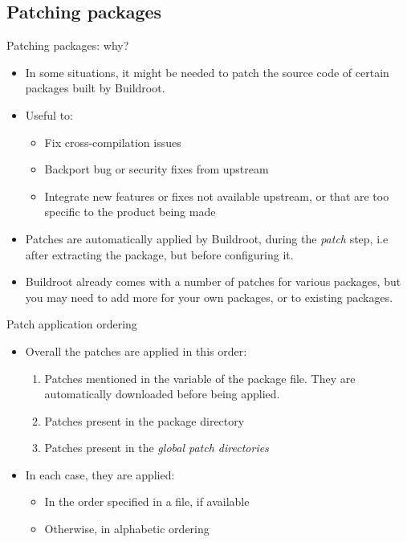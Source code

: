 \subsection{Patching packages}

\begin{frame}{Patching packages: why?}
  \begin{itemize}
  \item In some situations, it might be needed to patch the source
    code of certain packages built by Buildroot.
  \item Useful to:
    \begin{itemize}
    \item Fix cross-compilation issues
    \item Backport bug or security fixes from upstream
    \item Integrate new features or fixes not available upstream, or
      that are too specific to the product being made
    \end{itemize}
  \item Patches are automatically applied by Buildroot, during the
    {\em patch} step, i.e after extracting the package, but before
    configuring it.
  \item Buildroot already comes with a number of patches for various
    packages, but you may need to add more for your own packages, or
    to existing packages.
  \end{itemize}
\end{frame}

\begin{frame}{Patch application ordering}
  \begin{itemize}
  \item Overall the patches are applied in this order:
    \begin{enumerate}
    \item Patches mentioned in the  variable of the
      package  file. They are automatically downloaded
      before being applied.
    \item Patches present in the package directory
    \item Patches present in the {\em global patch directories}
    \end{enumerate}
  \item In each case, they are applied:
    \begin{itemize}
    \item In the order specified in a  file, if available
    \item Otherwise, in alphabetic ordering
    \end{itemize}
  \end{itemize}
\end{frame}

